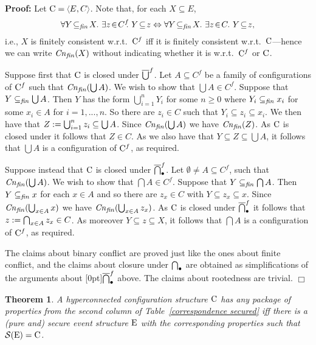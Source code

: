 \documentclass[twocolumn]{article}
\newtheorem{theo}{Theorem}
\newenvironment{theorem}[1]{\begin{theo} \rm \label{th-#1} }{\end{theo}}
\newenvironment{proof}{\begin{trivlist} \item[\hspace{\labelsep}\bf
Proof:]}{\hfill $\Box$\end{trivlist}}
\begin{document}
\begin{proof}
Let $\eC=\tuple{E,C}$.  Note that, for each $X \subseteq E$,
$$\forall Y\!\subseteq_{\it fin}\! X.~\exists z\!\in\!C^f\!\!.~Y\!\subseteq\!z
\Leftrightarrow
\forall Y\!\subseteq_{\it fin}\! X.~\exists z\!\in\!C.~Y\!\subseteq\!z,$$
i.e., $X$ is finitely consistent w.r.t.\ ${\rm C}^f$ iff it is
finitely consistent w.r.t.\ ${\rm C}$---hence we can write ${\it Cn}_{\it fin}(X)$
without indicating whether it is w.r.t.\ ${\rm C}^f$ or ${\rm C}$.

Suppose first that ${\rm C}$ is closed under $\overline{\bigcup}^f$.  Let
$A \subseteq C^f$ be a family of configurations of ${\rm C}^f$ such that
${\it Cn}_{\it fin}(\bigcup A)$.  We wish to show that $\bigcup A \in C^f$. Suppose
that $Y \subseteq_{\it fin} \bigcup A$.  Then $Y$ has the form
$\bigcup_{i = 1}^n Y_i$ for some $n \geq 0$ where $Y_i\subseteq_{\it
fin} x_i$ for some $x_i\in A$ for $i = 1,...,n$. So there are $z_i \in
C$ such that $Y_i\subseteq z_i \subseteq x_i$.  We then have that
$Z:= \bigcup_{i=1}^n z_i \subseteq \bigcup A$.  Since
${\it Cn}_{\it fin}(\bigcup A)$ we have ${\it Cn}_{\it fin}(Z)$.  As ${\rm C}$ is closed under
 it follows that $Z\in C$.  As we also have that
$Y \subseteq Z \subseteq \bigcup A$, it follows that $\bigcup A$ is a
configuration of ${\rm C}^f$, as required.

Suppose instead that ${\rm C}$ is closed under $\overline{\bigcap}_{\bullet}^f$.  Let
$\emptyset \neq A \subseteq C^f$, such that ${\it Cn}_{\it fin}(\bigcup A)$.  We wish
to show that $\bigcap A \in C^f$.  Suppose that $Y \subseteq_{\it fin}
\bigcap A$.  Then $Y\subseteq_{\it fin} x$ for each $x\!\in\!A$ and so
there are $z_x\!\in C$ with $Y\subseteq z_x \subseteq x$. Since
${\it Cn}_{\it fin}(\bigcup_{x \in A} x)$ we have ${\it Cn}_{\it fin}(\bigcup_{x \in A} z_x)$.
As ${\rm C}$ is closed under $\overline{\bigcap}_{\bullet}^f$ it follows that
$z := \bigcap_{x\in A} z_x \in C$.  As moreover
$Y \subseteq z\subseteq X$, it follows that $\bigcap A$ is a
configuration of ${\rm C}^f$, as required.

The claims about binary conflict are proved just like the ones about
finite conflict, and the claims about closure under $\bigcap_{\bullet}$ are
obtained as simplifications of the arguments about
\raisebox{-1pt}[0pt]{$\overline{\bigcap}_{\bullet}^f$} above. The claims about rootedness are trivial.
\end{proof}

\begin{theorem}{CtoE-secured}
A hyperconnected configuration structure ${\rm C}$ has any package of
properties from the second column of Table~\ref{correspondence
secured} iff there is a (pure and) secure event structure ${\rm E}$ with
the corresponding properties such that ${\cal S}({\rm E}) = {\rm C}$.
\end{theorem}
\end{document}
